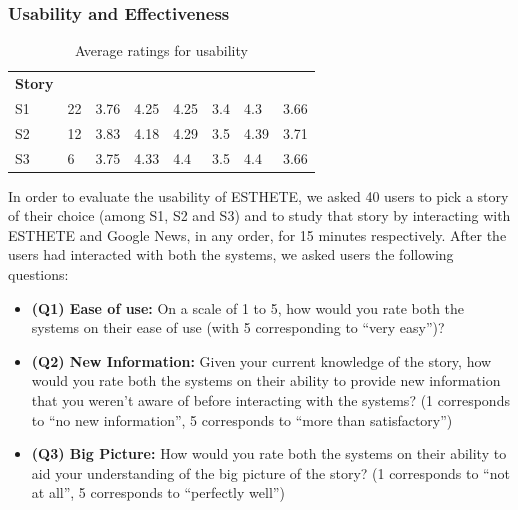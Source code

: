 \subsubsection{Usability and Effectiveness}
\label{subsec:usability}
\begin{table}
\begin{center}
\small
\begin{tabular}{|p{.63cm}|p{.60cm}|p{1.05cm}|p{.75cm}|p{1.0cm}|p{.75cm}|p{1.0cm}|p{.75cm}|}
\hline
\multirow{2}{*}{{\bf Story}} & \multirow{2}{*}{\parbox{.75cm}{}} & \multicolumn{2}{p{1.75cm}}{\centering{\bf Ease of use}} & \multicolumn{2}{p{1.75cm}}{\centering{\bf New Information}} & \multicolumn{2}{p{1.75cm}}{\centering{\bf Big Picture}}\\ \cline{3-8}
& & {\raggedleft{Esthete}} & {\raggedleft{Google News}} &{\raggedleft{ Esthete}} & {\raggedleft{Google News}} & {\raggedleft{Esthete}} & {\raggedleft{Google News}} \\
\hline
S1 & 22 & 3.76 & 4.25 & 4.25 & 3.4 & 4.3 & 3.66\\
S2 & 12 & 3.83 & 4.18 & 4.29 & 3.5 & 4.39 & 3.71 \\
S3 & 6 & 3.75 & 4.33 & 4.4 & 3.5 & 4.4 & 3.66\\
\hline
\end{tabular}
\end{center}
\caption{Average ratings for usability}
\label{tab:ease}
\end{table}

\normalsize
In order to evaluate the usability of ESTHETE, we asked 40 users to pick a story of their choice (among S1, S2 and S3) and to study that story by interacting with ESTHETE and Google News, in any order, for 15 minutes respectively. After the users had interacted with both the systems, we asked users the following questions:

\begin{itemize}
	\item {\bf (Q1) Ease of use:} On a scale of 1 to 5, how would you rate both the systems on their ease of use (with 5 corresponding to ``very easy'')?
	\item {\bf (Q2) New Information:} Given your current knowledge of the story, how would you rate both the systems on their ability to provide new information that you weren't aware of before interacting with the systems? (1 corresponds to ``no new information'', 5 corresponds to ``more than satisfactory'')
	\item {\bf (Q3) Big Picture:} How would you rate both the systems on their ability to aid your understanding of the big picture of the story? (1 corresponds to ``not at all'', 5 corresponds to ``perfectly well'')
\end{itemize}

